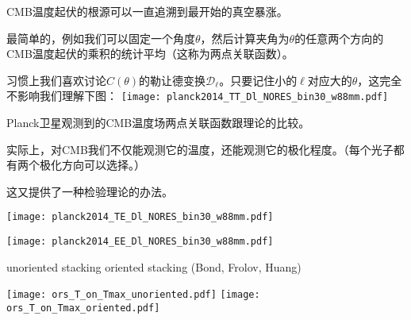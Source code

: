 \documentclass[CJK]{beamer}
\begin{document}

\begin{frame}
\bch
CMB温度起伏的根源可以一直追溯到最开始的真空暴涨。


\skipline
最简单的，例如我们可以固定一个角度$\theta$，然后计算夹角为$\theta$的任意两个方向的CMB温度起伏的乘积的统计平均（这称为两点关联函数）。
\ech
\end{frame}

\begin{frame}
\bch
习惯上我们喜欢讨论$C(\theta)$的勒让德变换$\mathcal{D}_\ell$。只要记住小的$\ell$对应大的$\theta$，这完全不影响我们理解下图：
  \texttt{[image: planck2014\_TT\_Dl\_NORES\_bin30\_w88mm.pdf]}

  Planck卫星观测到的CMB温度场两点关联函数跟理论的比较。
\ech
\end{frame}

\begin{frame}
\bch
实际上，对CMB我们不仅能观测它的温度，还能观测它的极化程度。（每个光子都有两个极化方向可以选择。）


这又提供了一种检验理论的办法。
\ech
\end{frame}


\begin{frame}
  \texttt{[image: planck2014\_TE\_Dl\_NORES\_bin30\_w88mm.pdf]}
\end{frame}

\begin{frame}
  \texttt{[image: planck2014\_EE\_Dl\_NORES\_bin30\_w88mm.pdf]}
\end{frame}


\begin{frame}
  
  {\hskip 0.2in} {\scriptsize unoriented stacking}     {\hskip 0.65in} {\scriptsize oriented stacking (Bond, Frolov, Huang)}
            
  \texttt{[image: ors\_T\_on\_Tmax\_unoriented.pdf]}  
  \texttt{[image: ors\_T\_on\_Tmax\_oriented.pdf]}
\end{frame}
\end{document}
